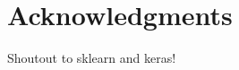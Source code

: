 \documentclass[sigplan,screen]{acmart}
\begin{document}

\section{Acknowledgments}
Shoutout to sklearn and keras! 



\end{document}
